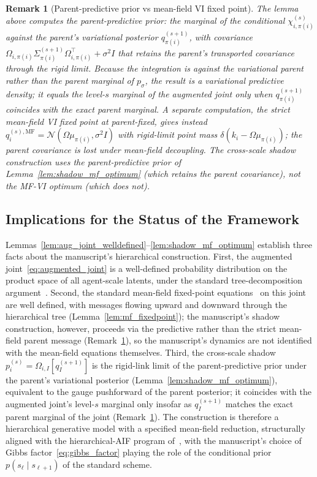 \documentclass[11pt]{article}
\newtheorem{remark}{Remark}
\begin{document}
\begin{remark}[Parent-predictive prior vs mean-field VI fixed point]
\label{rem:shadow_marginal_vs_mf}
The lemma above computes the parent-predictive prior: the marginal of the conditional $\chi_{i,\pi(i)}^{(s)}$ against the parent's variational posterior $q_{\pi(i)}^{(s+1)}$, with covariance $\Omega_{i,\pi(i)} \Sigma_{\pi(i)}^{(s+1)} \Omega_{i,\pi(i)}^\top + \sigma^2 I$ that retains the parent's transported covariance through the rigid limit. Because the integration is against the variational parent rather than the parent marginal of $p_\sigma$, the result is a variational predictive density; it equals the level-$s$ marginal of the augmented joint only when $q_{\pi(i)}^{(s+1)}$ coincides with the exact parent marginal. A separate computation, the strict mean-field VI fixed point at parent-fixed, gives instead $q_i^{(s),\mathrm{MF}} = \mathcal{N}(\Omega \mu_{\pi(i)}, \sigma^2 I)$ with rigid-limit point mass $\delta(k_i - \Omega \mu_{\pi(i)})$; the parent covariance is lost under mean-field decoupling. The cross-scale shadow construction uses the parent-predictive prior of Lemma~\ref{lem:shadow_mf_optimum} (which retains the parent covariance), not the MF-VI optimum (which does not).
\end{remark}

\subsection{Implications for the Status of the Framework}

Lemmas~\ref{lem:aug_joint_welldefined}--\ref{lem:shadow_mf_optimum} establish three facts about the manuscript's hierarchical construction. First, the augmented joint~\eqref{eq:augmented_joint} is a well-defined probability distribution on the product space of all agent-scale latents, under the standard tree-decomposition argument~\cite[\S3.2]{Lauritzen1996}. Second, the standard mean-field fixed-point equations~\cite[Prop.~4.1]{Wainwright2008} on this joint are well defined, with messages flowing upward and downward through the hierarchical tree (Lemma~\ref{lem:mf_fixedpoint}); the manuscript's shadow construction, however, proceeds via the predictive rather than the strict mean-field parent message (Remark~\ref{rem:shadow_marginal_vs_mf}), so the manuscript's dynamics are not identified with the mean-field equations themselves. Third, the cross-scale shadow $p_i^{(s)} = \Omega_{i,I}[q_I^{(s+1)}]$ is the rigid-link limit of the parent-predictive prior under the parent's variational posterior (Lemma~\ref{lem:shadow_mf_optimum}), equivalent to the gauge pushforward of the parent posterior; it coincides with the augmented joint's level-$s$ marginal only insofar as $q_I^{(s+1)}$ matches the exact parent marginal of the joint (Remark~\ref{rem:shadow_marginal_vs_mf}). The construction is therefore a hierarchical generative model with a specified mean-field reduction, structurally aligned with the hierarchical-AIF program of~\cite{Friston2017, parr2022active}, with the manuscript's choice of Gibbs factor~\eqref{eq:gibbs_factor} playing the role of the conditional prior $p(s_\ell \mid s_{\ell+1})$ of the standard scheme.
\end{document}
